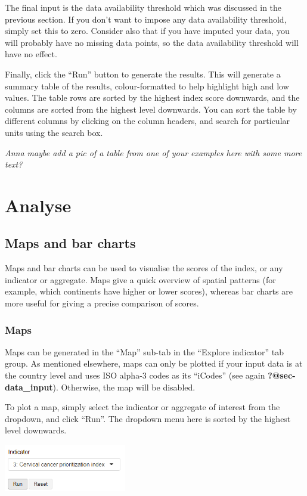 \documentclass[
  letterpaper,
  DIV=11,
  numbers=noendperiod]{scrreprt}
\begin{document}
The final input is the data availability threshold which was discussed
in the previous section. If you don't want to impose any data
availability threshold, simply set this to zero. Consider also that if
you have imputed your data, you will probably have no missing data
points, so the data availability threshold will have no effect.

Finally, click the ``Run'' button to generate the results. This will
generate a summary table of the results, colour-formatted to help
highlight high and low values. The table rows are sorted by the highest
index score downwards, and the columns are sorted from the highest level
downwards. You can sort the table by different columns by clicking on
the column headers, and search for particular units using the search
box.

\emph{Anna maybe add a pic of a table from one of your examples here
with some more text?}

\part{Analyse}

\hypertarget{sec-map_bar}{%
\chapter{Maps and bar charts}\label{sec-map_bar}}

Maps and bar charts can be used to visualise the scores of the index, or
any indicator or aggregate. Maps give a quick overview of spatial
patterns (for example, which continents have higher or lower scores),
whereas bar charts are more useful for giving a precise comparison of
scores.

\hypertarget{maps}{%
\section{Maps}\label{maps}}

Maps can be generated in the ``Map'' sub-tab in the ``Explore
indicator'' tab group. As mentioned elsewhere, maps can only be plotted
if your input data is at the country level and uses ISO alpha-3 codes as
its ``iCodes'' (see again \textbf{?@sec-data\_input}). Otherwise, the
map will be disabled.

To plot a map, simply select the indicator or aggregate of interest from
the dropdown, and click ``Run''. The dropdown menu here is sorted by the
highest level downwards.

\includegraphics[width=0.4\textwidth,height=\textheight]{figs/map_bar_2.png}
\end{document}
